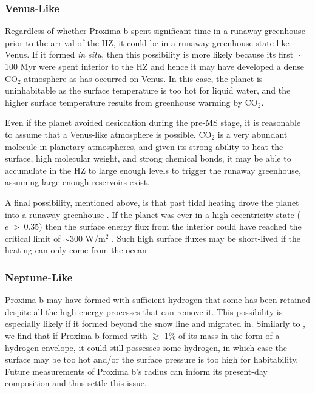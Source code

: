 \documentclass[preprint,12pt]{aastex}
\begin{document}
\subsubsection{Venus-Like}
\label{sec:results:atmstates:venuslike}

Regardless of whether Proxima b spent significant time in a runaway
greenhouse prior to the arrival of the HZ, it could be in a runaway
greenhouse state like Venus. If it formed {\it in situ}, then this
possibility is more likely because its first $\sim$100 Myr were spent
interior to the HZ and hence it may have developed a dense CO$_2$
atmosphere as has occurred on Venus. In this case, the planet is
uninhabitable as the surface temperature is too hot for liquid water,
and the higher surface temperature results from greenhouse warming by
CO$_2$.

Even if the planet avoided desiccation during the pre-MS stage, it is
reasonable to assume that a Venus-like atmosphere is possible. CO$_2$
is a very abundant molecule in planetary atmospheres, and given its
strong ability to heat the surface, high molecular weight, and strong
chemical bonds, it may be able to accumulate in the HZ to large enough
levels to trigger the runaway greenhouse, assuming large enough
reservoirs exist.

A final possibility, mentioned above, is that past tidal heating drove
the planet into a runaway greenhouse \citep{Barnes13}. If the planet
was ever in a high eccentricity state ($e~>~0.35$) then the surface
energy flux from the interior could have reached the critical limit of
$\sim$300 W/m$^2$ \citep{Kasting93,Abe93,Goldblatt15}. Such high
surface fluxes may be short-lived if the heating can only come from
the ocean \citep{DriscollBarnes15}.

\subsubsection{Neptune-Like}
\label{sec:results:atmstates:neptunelike}

Proxima b may have formed with sufficient hydrogen that some has been
retained despite all the high energy processes that can remove
it. This possibility is especially likely if it formed beyond the snow
line and migrated in. Similarly to \cite{OwenMohanty16}, we find that
if Proxima b formed with $\gtrsim$ 1\% of its mass in the form of a
hydrogen envelope, it could still possesses some hydrogen, in which
case the surface may be too hot and/or the surface pressure is too
high for habitability.  Future measurements of Proxima b's radius can
inform its present-day composition and thus settle this issue.
\end{document}
